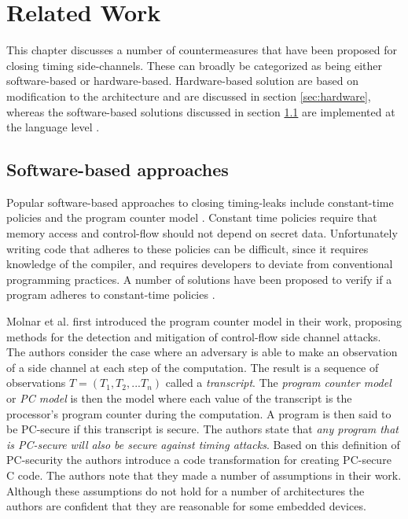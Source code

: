 
\chapter{Related Work}
\label{cha:related}
This chapter discusses a number of countermeasures that have been proposed for closing timing side-channels. 
These can broadly be categorized as being either software-based or hardware-based. 
Hardware-based solution are based on modification to the architecture and are discussed in section \ref{sec:hardware}, whereas the software-based solutions discussed in section \ref{sec:software} are implemented at the language level \cite{Barthe}.  
\section{Software-based approaches}
\label{sec:software}

Popular software-based approaches to closing timing-leaks include constant-time policies and the program counter model \cite{Barthe}. 
Constant time policies require that memory access and control-flow should not depend on secret data. 
Unfortunately writing code that adheres to these policies can be difficult, since it requires knowledge of the compiler, and requires developers to deviate from 
conventional programming practices.
A number of solutions have been proposed to verify if a program adheres to constant-time policies \cite{verify-constant-time, Barthe}.

Molnar et al. \cite{programcounter} first introduced the program counter model in their work, proposing methods for the detection and mitigation of control-flow side channel attacks. 
The authors consider the case where an adversary is able to make an observation of a side channel at each step of the computation. 
The result is a sequence of observations $T= (T_1, T_2, ... T_n)$ called a \textit{transcript}.
The \textit{program counter model} or \textit{PC model} is then the model where each value of the transcript is the processor's program counter during the computation. 
A program is then said to be  PC-secure if this transcript is secure. 
The authors state that \textit{any program that is PC-secure will also be secure against timing attacks}.
Based on this definition of PC-security the authors introduce a code transformation for creating PC-secure C code.
The authors note that they made a number of assumptions in their work. 
Although these assumptions do not hold for a number of architectures the authors are confident 
that they are reasonable for some embedded devices. 	


